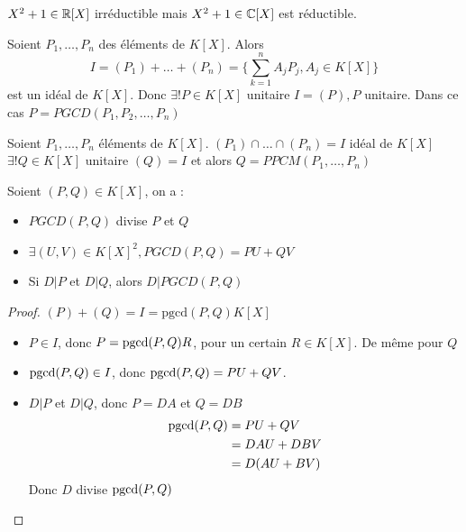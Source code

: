 \documentclass[]{report}
\begin{document}
    \begin{ex}{}{}
        $X^2+1\in\mathbb{R}[X]$ irréductible mais $X^2+1\in\mathbb{C}[X]$ est réductible.
    \end{ex}

    \begin{df}{}{}
        Soient $P_1,\dots,P_n$ des éléments de $K[X]$. Alors $$I=(P_1)+\dots+(P_n)=\{\sum_{k=1}^nA_jP_j,A_j\in K[X]\}$$ est un idéal de $K[X]$. Donc $\exists!P\in K[X]$ unitaire \tq $I=(P), P\text{ unitaire}$. Dans ce cas $P=PGCD(P_1,P_2,\dots,P_n)$
    \end{df}

    \begin{df}{}{}
        Soient $P_1,\dots,P_n$ éléments de $K[X]$. $(P_1)\cap\dots\cap(P_n)=I$ idéal de $K[X]$\\
        $\exists! Q \in K[X]$ unitaire \tq $(Q)=I$ et alors $Q=PPCM(P_1,\dots,P_n)$
    \end{df}

    \begin{prop}{}{}
        Soient $(P,Q)\in K[X]$, on a :\begin{itemize}
            \item $PGCD(P,Q)$ divise $P$ et $Q$
            \item $\exists(U,V)\in K[X]^2,PGCD(P,Q)=PU+QV$
            \item Si $D|P$ et $D|Q$, alors $D|PGCD(P,Q)$
        \end{itemize}
    \end{prop}

    \begin{proof}
        $(P)+(Q)=I=\text{pgcd}(P,Q)K[X]$
        \begin{itemize}
            \item $P\in I$, donc $P=\text{pgcd} (P,Q) R$, pour un certain $R\in K[X]$. De même pour $Q$
            \item $\text{pgcd} (P,Q)\in I$, donc $\text{pgcd} (P,Q)=PU+QV$.
            \item $D|P$ et $D|Q$, donc $P=DA$ et $Q=DB$
            \begin{align*}
                \text{pgcd}(P,Q)&=PU+QV\\
                &=DAU+DBV\\
                &=D(AU+BV)
            \end{align*}
            Donc $D$ divise $\text{pgcd} (P,Q)$
        \end{itemize}
    \end{proof}
\end{document}

